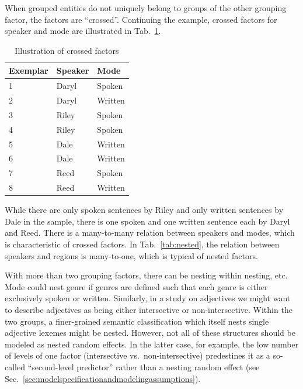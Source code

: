 When grouped entities do not uniquely belong to groups of the other grouping factor, the factors are ``crossed''.
Continuing the example, crossed factors for speaker and mode are illustrated in Tab.~\ref{tab:crossed}.
%
\begin{table}
  \centering
  \caption{Illustration of crossed factors}
  \begin{tabular}{lll}
    \toprule
    \textbf{Exemplar} & \textbf{Speaker}  & \textbf{Mode}   \\
    \midrule
                    1 &           Daryl  &         Spoken  \\
                    2 &           Daryl  &         Written \\
                    3 &           Riley  &         Spoken  \\
                    4 &           Riley  &         Spoken  \\
                    5 &           Dale   &         Written \\
                    6 &           Dale   &         Written \\
                    7 &           Reed   &         Spoken  \\
                    8 &           Reed   &         Written \\
    \bottomrule
  \end{tabular}
  \label{tab:crossed}
\end{table}
%
While there are only spoken sentences by Riley and only written sentences by Dale in the sample, there is one spoken and one written sentence each by Daryl and Reed.
There is a many-to-many relation between speakers and modes, which is characteristic of crossed factors.
In Tab.~\ref{tab:nested}, the relation between speakers and regions is many-to-one, which is typical of nested factors.

With more than two grouping factors, there can be nesting within nesting, etc.
Mode could nest genre if genres are defined such that each genre is either exclusively spoken or written.
Similarly, in a study on adjectives we might want to describe adjectives as being either intersective or non-intersective.
Within the two groups, a finer-grained semantic classification which itself nests single adjective lexemes might be nested.
However, not all of these structures should be modeled as nested random effects.
In the latter case, for example, the low number of levels of one factor (intersective vs.\ non-intersective) predestines it as a so-called ``second-level predictor'' rather than a nesting random effect (see Sec.~\ref{sec:modelspecificationandmodelingassumptions}).

